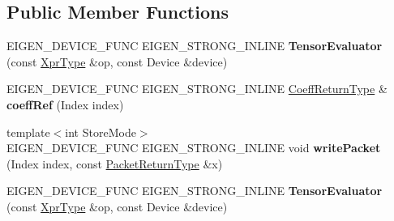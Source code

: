 \subsection*{Public Member Functions}
\begin{DoxyCompactItemize}
\item 
\mbox{\label{struct_eigen_1_1_tensor_evaluator_3_01_tensor_reshaping_op_3_01_new_dimensions_00_01_arg_type_01_4_00_01_device_01_4_a6a6de18dce773a23926e7531da8b3b1d}} 
E\+I\+G\+E\+N\+\_\+\+D\+E\+V\+I\+C\+E\+\_\+\+F\+U\+NC E\+I\+G\+E\+N\+\_\+\+S\+T\+R\+O\+N\+G\+\_\+\+I\+N\+L\+I\+NE {\bfseries Tensor\+Evaluator} (const \hyperlink{class_eigen_1_1_tensor_reshaping_op}{Xpr\+Type} \&op, const Device \&device)
\item 
\mbox{\label{struct_eigen_1_1_tensor_evaluator_3_01_tensor_reshaping_op_3_01_new_dimensions_00_01_arg_type_01_4_00_01_device_01_4_a9106547d9070fac1db8f42a9f06de323}} 
E\+I\+G\+E\+N\+\_\+\+D\+E\+V\+I\+C\+E\+\_\+\+F\+U\+NC E\+I\+G\+E\+N\+\_\+\+S\+T\+R\+O\+N\+G\+\_\+\+I\+N\+L\+I\+NE \hyperlink{group___sparse_core___module}{Coeff\+Return\+Type} \& {\bfseries coeff\+Ref} (Index index)
\item 
\mbox{\label{struct_eigen_1_1_tensor_evaluator_3_01_tensor_reshaping_op_3_01_new_dimensions_00_01_arg_type_01_4_00_01_device_01_4_a1e619f18e6f6c3a74db01c0e615f4b02}} 
{\footnotesize template$<$int Store\+Mode$>$ }\\E\+I\+G\+E\+N\+\_\+\+D\+E\+V\+I\+C\+E\+\_\+\+F\+U\+NC E\+I\+G\+E\+N\+\_\+\+S\+T\+R\+O\+N\+G\+\_\+\+I\+N\+L\+I\+NE void {\bfseries write\+Packet} (Index index, const \hyperlink{group___sparse_core___module}{Packet\+Return\+Type} \&x)
\item 
\mbox{\label{struct_eigen_1_1_tensor_evaluator_3_01_tensor_reshaping_op_3_01_new_dimensions_00_01_arg_type_01_4_00_01_device_01_4_a6a6de18dce773a23926e7531da8b3b1d}} 
E\+I\+G\+E\+N\+\_\+\+D\+E\+V\+I\+C\+E\+\_\+\+F\+U\+NC E\+I\+G\+E\+N\+\_\+\+S\+T\+R\+O\+N\+G\+\_\+\+I\+N\+L\+I\+NE {\bfseries Tensor\+Evaluator} (const \hyperlink{class_eigen_1_1_tensor_reshaping_op}{Xpr\+Type} \&op, const Device \&device)

\end{DoxyCompactItemize}
